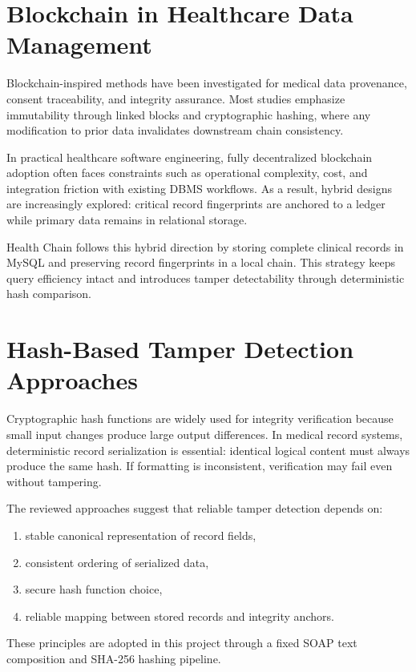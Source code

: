 \documentclass[12pt,a4paper]{report}
\begin{document}
\section{Blockchain in Healthcare Data Management}

Blockchain-inspired methods have been investigated for medical data provenance, consent traceability, and integrity assurance. Most studies emphasize immutability through linked blocks and cryptographic hashing, where any modification to prior data invalidates downstream chain consistency.

In practical healthcare software engineering, fully decentralized blockchain adoption often faces constraints such as operational complexity, cost, and integration friction with existing DBMS workflows. As a result, hybrid designs are increasingly explored: critical record fingerprints are anchored to a ledger while primary data remains in relational storage.

Health Chain follows this hybrid direction by storing complete clinical records in MySQL and preserving record fingerprints in a local chain. This strategy keeps query efficiency intact and introduces tamper detectability through deterministic hash comparison.

\section{Hash-Based Tamper Detection Approaches}

Cryptographic hash functions are widely used for integrity verification because small input changes produce large output differences. In medical record systems, deterministic record serialization is essential: identical logical content must always produce the same hash. If formatting is inconsistent, verification may fail even without tampering.

The reviewed approaches suggest that reliable tamper detection depends on:

\begin{enumerate}
\item stable canonical representation of record fields,
\item consistent ordering of serialized data,
\item secure hash function choice,
\item reliable mapping between stored records and integrity anchors.
\end{enumerate}

These principles are adopted in this project through a fixed SOAP text composition and SHA-256 hashing pipeline.
\end{document}
